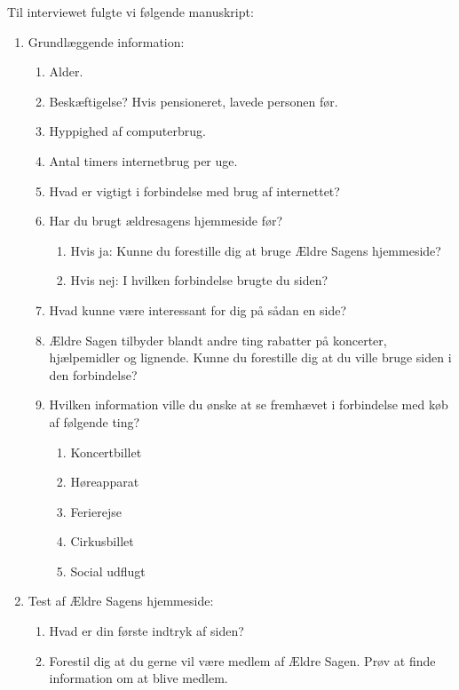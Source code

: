 Til interviewet fulgte vi følgende manuskript:

\begin{enumerate}
    \item Grundlæggende information:
    \begin{enumerate}
        \item Alder.
        \item Beskæftigelse? Hvis pensioneret, lavede personen før.
        \item Hyppighed af computerbrug.
        \item Antal timers internetbrug per uge.
        \item Hvad er vigtigt i forbindelse med brug af internettet?
        \item Har du brugt ældresagens hjemmeside før?
        \begin{enumerate}
            \item Hvis ja: Kunne du forestille dig at bruge Ældre Sagens hjemmeside?
            \item Hvis nej: I hvilken forbindelse brugte du siden?
        \end{enumerate}
        \item Hvad kunne være interessant for dig på sådan en side?
        \item Ældre Sagen tilbyder blandt andre ting rabatter på koncerter, hjælpemidler og lignende. Kunne du forestille dig at du ville bruge siden i den forbindelse?
        \item Hvilken information ville du ønske at se fremhævet i forbindelse med køb af følgende ting?
        \begin{enumerate}
            \item Koncertbillet
            \item Høreapparat
            \item Ferierejse
            \item Cirkusbillet
            \item Social udflugt
        \end{enumerate}
    \end{enumerate}
    \item Test af Ældre Sagens hjemmeside:
    \begin{enumerate}
        \item Hvad er din første indtryk af siden?
        \item Forestil dig at du gerne vil være medlem af Ældre Sagen. Prøv at finde information om at blive medlem.
        \begin{enumerate}

\end{enumerate}
\end{enumerate}
\end{enumerate}
